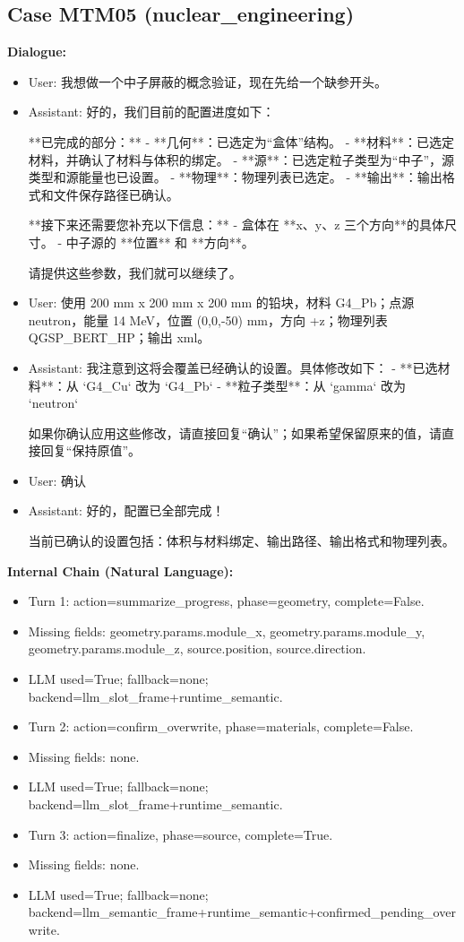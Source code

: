 \documentclass[11pt]{ctexart}
\begin{document}
\subsection{Case MTM05 (nuclear\_engineering)}
\textbf{Dialogue:}
\begin{itemize}
\item User: 我想做一个中子屏蔽的概念验证，现在先给一个缺参开头。
\item Assistant: 好的，我们目前的配置进度如下：

**已完成的部分：**
- **几何**：已选定为“盒体”结构。
- **材料**：已选定材料，并确认了材料与体积的绑定。
- **源**：已选定粒子类型为“中子”，源类型和源能量也已设置。
- **物理**：物理列表已选定。
- **输出**：输出格式和文件保存路径已确认。

**接下来还需要您补充以下信息：**
- 盒体在 **x、y、z 三个方向**的具体尺寸。
- 中子源的 **位置** 和 **方向**。

请提供这些参数，我们就可以继续了。
\item User: 使用 200 mm x 200 mm x 200 mm 的铅块，材料 G4\_Pb；点源 neutron，能量 14 MeV，位置 (0,0,-50) mm，方向 +z；物理列表 QGSP\_BERT\_HP；输出 xml。
\item Assistant: 我注意到这将会覆盖已经确认的设置。具体修改如下：
- **已选材料**：从 `G4\_Cu` 改为 `G4\_Pb`
- **粒子类型**：从 `gamma` 改为 `neutron`

如果你确认应用这些修改，请直接回复“确认”；如果希望保留原来的值，请直接回复“保持原值”。
\item User: 确认
\item Assistant: 好的，配置已全部完成！

当前已确认的设置包括：体积与材料绑定、输出路径、输出格式和物理列表。
\end{itemize}
\textbf{Internal Chain (Natural Language):}
\begin{itemize}
\item Turn 1: action=summarize\_progress, phase=geometry, complete=False.
\item Missing fields: geometry.params.module\_x, geometry.params.module\_y, geometry.params.module\_z, source.position, source.direction.
\item LLM used=True; fallback=none; backend=llm\_slot\_frame+runtime\_semantic.
\item Turn 2: action=confirm\_overwrite, phase=materials, complete=False.
\item Missing fields: none.
\item LLM used=True; fallback=none; backend=llm\_slot\_frame+runtime\_semantic.
\item Turn 3: action=finalize, phase=source, complete=True.
\item Missing fields: none.
\item LLM used=True; fallback=none; backend=llm\_semantic\_frame+runtime\_semantic+confirmed\_pending\_overwrite.
\end{itemize}
\end{document}
